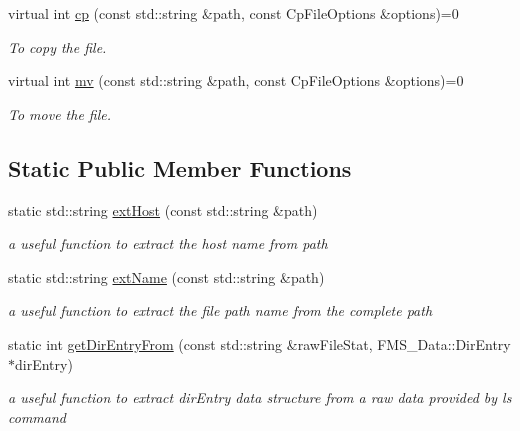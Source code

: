 \begin{DoxyCompactItemize}
virtual int \hyperlink{classFile_a29eed199fb54187949ecd0cb5828a376}{cp} (const std::string \&path, const CpFileOptions \&options)=0
\begin{DoxyCompactList}\small\item\em To copy the file. \item\end{DoxyCompactList}\item 
virtual int \hyperlink{classFile_acc9987632d392f01748ea4f58455c4d0}{mv} (const std::string \&path, const CpFileOptions \&options)=0
\begin{DoxyCompactList}\small\item\em To move the file. \item\end{DoxyCompactList}\end{DoxyCompactItemize}
\subsection*{Static Public Member Functions}
\begin{DoxyCompactItemize}
\item 
static std::string \hyperlink{classFile_ab91c3d08d46d0d2dac03cce0e912add5}{extHost} (const std::string \&path)
\begin{DoxyCompactList}\small\item\em a useful function to extract the host name from path \item\end{DoxyCompactList}\item 
static std::string \hyperlink{classFile_aec682e21e601fd41e09a612485e94e27}{extName} (const std::string \&path)
\begin{DoxyCompactList}\small\item\em a useful function to extract the file path name from the complete path \item\end{DoxyCompactList}\item 
static int \hyperlink{classFile_a5c5498499bbecd60255a3f9d81eb72c2}{getDirEntryFrom} (const std::string \&rawFileStat, FMS\_\-Data::DirEntry $\ast$dirEntry)
\begin{DoxyCompactList}\small\item\em a useful function to extract dirEntry data structure from a raw data provided by ls command \item\end{DoxyCompactList}\end{DoxyCompactItemize}
